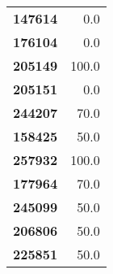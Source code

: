 \documentclass[11pt]{article}
\begin{document}
\begin{center}
\begin{longtable}{lr}
\textbf{147614} &                   0.0 \\
\textbf{176104} &                   0.0 \\
\textbf{205149} &                 100.0 \\
\textbf{205151} &                   0.0 \\
\textbf{244207} &                  70.0 \\
\textbf{158425} &                  50.0 \\
\textbf{257932} &                 100.0 \\
\textbf{177964} &                  70.0 \\
\textbf{245099} &                  50.0 \\
\textbf{206806} &                  50.0 \\
\textbf{225851} &                  50.0 \\
\end{longtable}
\end{center}
\end{document}
